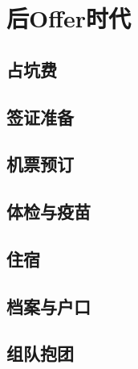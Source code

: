 \chapter{后Offer时代}
\newpage
\section{占坑费}
\section{签证准备}
\section{机票预订}
\section{体检与疫苗}
\section{住宿}
\section{档案与户口}
\section{组队抱团}